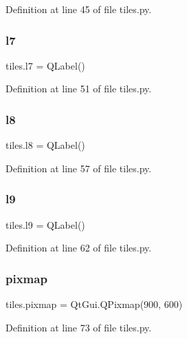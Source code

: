 Definition at line 45 of file tiles.\+py.

\mbox{\label{namespacetiles_a8c60d04f5e9dc003d17bd679b0e2d7de}} 
\subsubsection{\texorpdfstring{l7}{l7}}
{\footnotesize\ttfamily tiles.\+l7 = Q\+Label()}



Definition at line 51 of file tiles.\+py.

\mbox{\label{namespacetiles_a5d33be17753db433ec649d70534adc65}} 
\subsubsection{\texorpdfstring{l8}{l8}}
{\footnotesize\ttfamily tiles.\+l8 = Q\+Label()}



Definition at line 57 of file tiles.\+py.

\mbox{\label{namespacetiles_afbefb9ab7b2f488acfa44efcaa78b934}} 
\subsubsection{\texorpdfstring{l9}{l9}}
{\footnotesize\ttfamily tiles.\+l9 = Q\+Label()}



Definition at line 62 of file tiles.\+py.

\mbox{\label{namespacetiles_a2f61bf9f6911ee0493b484f713df252f}} 
\subsubsection{\texorpdfstring{pixmap}{pixmap}}
{\footnotesize\ttfamily tiles.\+pixmap = Qt\+Gui.\+Q\+Pixmap(900, 600)}



Definition at line 73 of file tiles.\+py.

\mbox{\label{namespacetiles_a1f0e8aa73ad9dec0ab47c5756348aec4}} 
